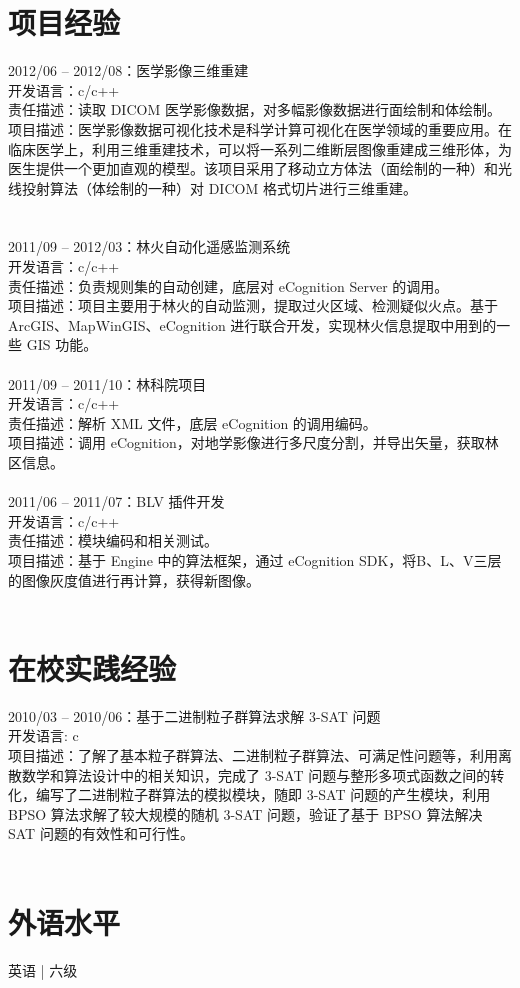 \documentclass[11pt, a4paper]{article}
\begin{document}
\section*{项目经验}

2012/06 -- 2012/08：医学影像三维重建 \\
开发语言：c/c++ \\
责任描述：读取 DICOM 医学影像数据，对多幅影像数据进行面绘制和体绘制。 \\
项目描述：医学影像数据可视化技术是科学计算可视化在医学领域的重要应用。在临床医学上，利用三维重建技术，可以将一系列二维断层图像重建成三维形体，为医生提供一个更加直观的模型。该项目采用了移动立方体法（面绘制的一种）和光线投射算法（体绘制的一种）对 DICOM 格式切片进行三维重建。 \\
\\
\\
2011/09 -- 2012/03：林火自动化遥感监测系统 \\
开发语言：c/c++ \\
责任描述：负责规则集的自动创建，底层对 eCognition Server 的调用。 \\
项目描述：项目主要用于林火的自动监测，提取过火区域、检测疑似火点。基于 ArcGIS、MapWinGIS、eCognition 进行联合开发，实现林火信息提取中用到的一些 GIS 功能。 \\
\\
2011/09 -- 2011/10：林科院项目 \\
开发语言：c/c++ \\
责任描述：解析 XML 文件，底层 eCognition 的调用编码。 \\
项目描述：调用 eCognition，对地学影像进行多尺度分割，并导出矢量，获取林区信息。 \\
\\
2011/06 -- 2011/07：BLV 插件开发 \\
开发语言：c/c++ \\
责任描述：模块编码和相关测试。 \\
项目描述：基于 Engine 中的算法框架，通过 eCognition SDK，将B、L、V三层的图像灰度值进行再计算，获得新图像。 \\
\\




\section*{在校实践经验}
2010/03 -- 2010/06：基于二进制粒子群算法求解 3-SAT 问题 \\
开发语言: c \\
项目描述：了解了基本粒子群算法、二进制粒子群算法、可满足性问题等，利用离散数学和算法设计中的相关知识，完成了 3-SAT 问题与整形多项式函数之间的转化，编写了二进制粒子群算法的模拟模块，随即 3-SAT 问题的产生模块，利用 BPSO 算法求解了较大规模的随机 3-SAT 问题，验证了基于 BPSO 算法解决 SAT 问题的有效性和可行性。 \\
\\



\section*{外语水平}
英语 | 六级 \\
\end{document}
